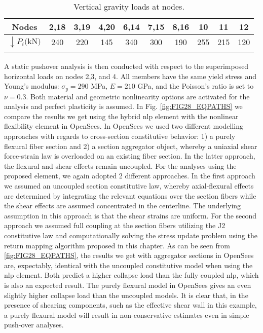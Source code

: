 \begin{table}[h]
	\centering
	\begin{minipage}{0.7\linewidth}
		\caption{Vertical gravity loads at nodes.}
		\begin{tabular}{cccccccccc}
			\toprule\toprule
			Nodes                         & 2,18 & 3,19 & 4,20& 6,14 & 7,15 & 
			8,16 & 10 & 11 & 12 \\
			\midrule
			$\downarrow P_i \text{(kN)}$  & 240  & 220  & 145 & 340 & 300 & 190 
			& 255 & 215 & 120 \\
			\bottomrule\bottomrule
			\label{table:TABLE10}
		\end{tabular}
	\end{minipage}
\end{table}

A static pushover analysis is then conducted with respect to the 
superimposed horizontal loads on nodes 2,3, 
and 4. All members have 
the same yield stress and Young's modulus: $\sigma_y = 290$ MPa, $E = 210$ GPa, 
and the Poisson's ratio is set to $\nu= 0.3$. Both material and geometric 
nonlinearity options are activated for the 
analysis and perfect plasticity is assumed. In Fig. \ref{fig:FIG28_EQPATHS} we 
compare the results we get using the hybrid \acrshort{nlp} element with the 
nonlinear flexibility element in 
OpenSees\cite{OpenSees}. In OpenSees we used two different modelling approaches 
with regards to cross-section constitutive behavior: 1) a purely flexural fiber 
section and 2) a section aggregator object, whereby a uniaxial shear 
force-strain law is overloaded on an existing fiber section. In the latter 
approach, the flexural and shear effects remain uncoupled. For the analyses 
using the proposed element, we again adopted 2 different approaches. In the 
first approach we assumed an uncoupled section constitutive law, whereby 
axial-flexural effects are determined by integrating the relevant equations 
over the section fibers while the shear effects are assumed concentrated in the 
centerline. The underlying assumption in this approach is that the shear 
strains are uniform. For the second approach we assumed full coupling at the 
section fibers utilizing the J2 constitutive law and computationally solving 
the stress update problem using the return mapping algorithm proposed in this 
chapter. As can be seen 
from \ref{fig:FIG28_EQPATHS}, the results we get with aggregator sections in 
OpenSees are, expectably, identical with the uncoupled constitutive model when 
using the \acrshort{nlp} element. Both predict a higher  
collapse load than the fully coupled \acrshort{nlp}, which is also an expected 
result. The purely flexural model in OpenSees gives an even slightly higher 
collapse load than the uncoupled models. It is clear that, in the presence of 
shearing components, such as the effective shear wall in this example, a purely 
flexural model will result in non-conservative estimates even in simple 
push-over analyses.  

